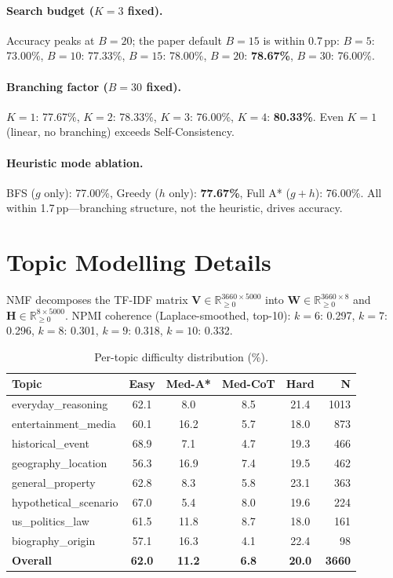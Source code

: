\documentclass[11pt]{article}
\newcommand{\pp}{\,pp\xspace}
\begin{document}
\paragraph{Search budget ($K{=}3$ fixed).}
Accuracy peaks at $B{=}20$; the paper default $B{=}15$ is within 0.7\pp:
$B{=}5$: 73.00\%, $B{=}10$: 77.33\%, $B{=}15$: 78.00\%, $B{=}20$: \textbf{78.67\%}, $B{=}30$: 76.00\%.

\paragraph{Branching factor ($B{=}30$ fixed).}
$K{=}1$: 77.67\%, $K{=}2$: 78.33\%, $K{=}3$: 76.00\%, $K{=}4$: \textbf{80.33\%}.
Even $K{=}1$ (linear, no branching) exceeds Self-Consistency.

\paragraph{Heuristic mode ablation.}
BFS ($g$ only): 77.00\%, Greedy ($h$ only): \textbf{77.67\%}, Full A* ($g{+}h$): 76.00\%.
All within 1.7\pp---branching structure, not the heuristic, drives accuracy.

\section{Topic Modelling Details}
\label{app:topics}

NMF decomposes the TF-IDF matrix
$\mathbf{V}\in\mathbb{R}_{\ge0}^{3660\times5000}$ into
$\mathbf{W}\in\mathbb{R}_{\ge0}^{3660\times8}$ and
$\mathbf{H}\in\mathbb{R}_{\ge0}^{8\times5000}$.
NPMI coherence (Laplace-smoothed, top-10): $k{=}6$: 0.297, $k{=}7$: 0.296,
$k{=}8$: 0.301, $k{=}9$: 0.318, $k{=}10$: 0.332.

\begin{table}[ht!]
\centering
\caption{Per-topic difficulty distribution (\%).}
\label{tab:difficulty_topic}
\small
\begin{tabular}{@{}lccccr@{}}
\toprule
\textbf{Topic} & \textbf{Easy} & \textbf{Med-A*} & \textbf{Med-CoT} & \textbf{Hard} & \textbf{N} \\
\midrule
everyday\_reasoning      & 62.1 & 8.0  & 8.5  & 21.4 & 1013 \\
entertainment\_media     & 60.1 & 16.2 & 5.7  & 18.0 & 873 \\
historical\_event        & 68.9 & 7.1  & 4.7  & 19.3 & 466 \\
geography\_location      & 56.3 & 16.9 & 7.4  & 19.5 & 462 \\
general\_property        & 62.8 & 8.3  & 5.8  & 23.1 & 363 \\
hypothetical\_scenario   & 67.0 & 5.4  & 8.0  & 19.6 & 224 \\
us\_politics\_law        & 61.5 & 11.8 & 8.7  & 18.0 & 161 \\
biography\_origin        & 57.1 & 16.3 & 4.1  & 22.4 & 98 \\
\midrule
\textbf{Overall}         & \textbf{62.0} & \textbf{11.2} & \textbf{6.8} & \textbf{20.0} & \textbf{3660} \\
\bottomrule
\end{tabular}
\end{table}
\end{document}
